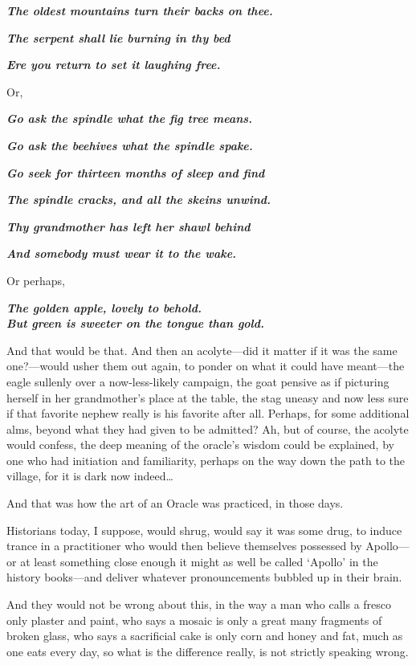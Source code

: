 \emph{\textbf{The oldest mountains turn their backs on thee.}}

\emph{\textbf{The serpent shall lie burning in thy bed}}

\emph{\textbf{Ere you return to set it laughing free.}}

Or,

\emph{\textbf{Go ask the spindle what the fig tree means.}}

\emph{\textbf{Go ask the beehives what the spindle spake.}}

\emph{\textbf{Go seek for thirteen months of sleep and find}}

\emph{\textbf{The spindle cracks, and all the skeins unwind.}}

\emph{\textbf{Thy grandmother has left her shawl behind}}

\emph{\textbf{And somebody must wear it to the wake.}}

Or perhaps,

\emph{\textbf{The golden apple, lovely to behold.\\
But green is sweeter on the tongue than gold.}}

And that would be that. And then an acolyte---did it matter if it was the same one?---would usher them out again, to ponder on what it could have meant---the eagle sullenly over a now-less-likely campaign, the goat pensive as if picturing herself in her grandmother's place at the table, the stag uneasy and now less sure if that favorite nephew really is his favorite after all. Perhaps, for some additional alms, beyond what they had given to be admitted? Ah, but of course, the acolyte would confess, the deep meaning of the oracle's wisdom could be explained, by one who had initiation and familiarity, perhaps on the way down the path to the village, for it is dark now indeed\ldots{}

And that was how the art of an Oracle was practiced, in those days.

Historians today, I suppose, would shrug, would say it was some drug, to induce trance in a practitioner who would then believe themselves possessed by Apollo---or at least something close enough it might as well be called `Apollo' in the history books---and deliver whatever pronouncements bubbled up in their brain.

And they would not be wrong about this, in the way a man who calls a fresco only plaster and paint, who says a mosaic is only a great many fragments of broken glass, who says a sacrificial cake is only corn and honey and fat, much as one eats every day, so what is the difference really, is not strictly speaking wrong.

